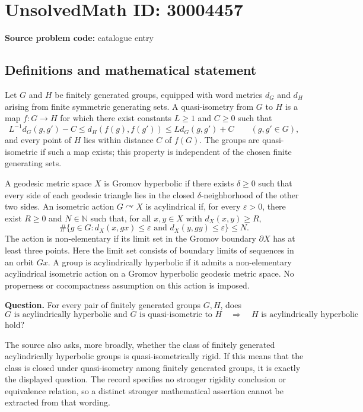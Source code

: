 \documentclass[11pt]{article}
\newcommand{\N}{\mathbb{N}}
\begin{document}
\section*{UnsolvedMath ID: 30004457}
\textbf{Source problem code:} catalogue entry
\subsection{Definitions and mathematical statement}
Let \(G\) and \(H\) be finitely generated groups, equipped with word metrics \(d_G\) and \(d_H\) arising from finite symmetric generating sets. A quasi-isometry from \(G\) to \(H\) is a map \(f:G\to H\) for which there exist constants \(L\geq 1\) and \(C\geq 0\) such that
\[
L^{-1}d_G(g,g')-C\leq d_H(f(g),f(g'))\leq Ld_G(g,g')+C
\qquad(g,g'\in G),
\]
and every point of \(H\) lies within distance \(C\) of \(f(G)\). The groups are quasi-isometric if such a map exists; this property is independent of the chosen finite generating sets.

A geodesic metric space \(X\) is Gromov hyperbolic if there exists \(\delta\geq 0\) such that every side of each geodesic triangle lies in the closed \(\delta\)-neighborhood of the other two sides. An isometric action \(G\curvearrowright X\) is acylindrical if, for every \(\varepsilon>0\), there exist \(R\geq 0\) and \(N\in\N\) such that, for all \(x,y\in X\) with \(d_X(x,y)\geq R\),
\[
\#\{g\in G: d_X(x,gx)\leq\varepsilon\text{ and }d_X(y,gy)\leq\varepsilon\}\leq N.
\]
The action is non-elementary if its limit set in the Gromov boundary \(\partial X\) has at least three points. Here the limit set consists of boundary limits of sequences in an orbit \(Gx\). A group is acylindrically hyperbolic if it admits a non-elementary acylindrical isometric action on a Gromov hyperbolic geodesic metric space. No properness or cocompactness assumption on this action is imposed.

\textbf{Question.} For every pair of finitely generated groups \(G,H\), does
\[
G\text{ is acylindrically hyperbolic and }G\text{ is quasi-isometric to }H
\quad\Longrightarrow\quad
H\text{ is acylindrically hyperbolic}
\]
hold?

The source also asks, more broadly, whether the class of finitely generated acylindrically hyperbolic groups is quasi-isometrically rigid. If this means that the class is closed under quasi-isometry among finitely generated groups, it is exactly the displayed question. The record specifies no stronger rigidity conclusion or equivalence relation, so a distinct stronger mathematical assertion cannot be extracted from that wording.
\end{document}
